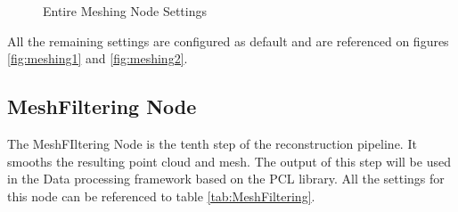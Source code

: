 \documentclass[12pt]{report}
\begin{document}
\begin{figure}[H]
  \centering
  \qquad
  \caption{Entire Meshing Node Settings}
  \label{fig:Meshingnodesettings}
\end{figure}

All the remaining settings are configured as default and are referenced on figures \ref{fig:meshing1} and \ref{fig:meshing2}.
\enlargethispage{\baselineskip}
\subsection*{MeshFiltering Node}
The MeshFIltering Node is the tenth step of the reconstruction pipeline. It smooths the resulting point cloud and mesh.
The output of this step will be used in the Data processing framework based on the PCL library.
All the settings for this node can be referenced to table \ref{tab:MeshFiltering}.
\end{document}
